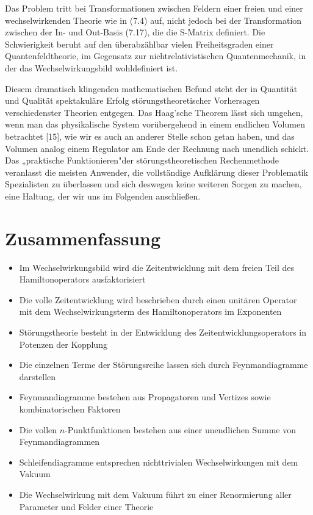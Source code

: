 \documentclass[10pt, letterpaper]{article}
\begin{document}
Das Problem tritt bei Transformationen zwischen Feldern einer freien und einer wechselwirkenden Theorie wie in (7.4) auf, nicht jedoch bei der Transformation zwischen der In- und Out-Basis (7.17), die die S-Matrix definiert. Die Schwierigkeit beruht auf den überabzählbar vielen Freiheitsgraden einer Quantenfeldtheorie, im Gegensatz zur nichtrelativistischen Quantenmechanik, in der das Wechselwirkungsbild wohldefiniert ist.

Diesem dramatisch klingenden mathematischen Befund steht der in Quantität und Qualität spektakuläre Erfolg störungstheoretischer Vorhersagen verschiedenster Theorien entgegen. Das Haag'sche Theorem lässt sich umgehen, wenn man das physikalische System vorübergehend in einem endlichen Volumen betrachtet [15], wie wir es auch an anderer Stelle schon getan haben, und das Volumen analog einem Regulator am Ende der Rechnung nach unendlich schickt. Das „praktische Funktionieren"der störungstheoretischen Rechenmethode veranlasst die meisten Anwender, die vollständige Aufklärung dieser Problematik Spezialisten zu überlassen und sich deswegen keine weiteren Sorgen zu machen, eine Haltung, der wir uns im Folgenden anschließen.

\section*{Zusammenfassung}
\begin{itemize}
  \item Im Wechselwirkungsbild wird die Zeitentwicklung mit dem freien Teil des Hamiltonoperators ausfaktorisiert
  \item Die volle Zeitentwicklung wird beschrieben durch einen unitären Operator mit dem Wechselwirkungsterm des Hamiltonoperators im Exponenten
  \item Störungstheorie besteht in der Entwicklung des Zeitentwicklungsoperators in Potenzen der Kopplung
  \item Die einzelnen Terme der Störungsreihe lassen sich durch Feynmandiagramme darstellen
  \item Feynmandiagramme bestehen aus Propagatoren und Vertizes sowie kombinatorischen Faktoren
  \item Die vollen $n$-Punktfunktionen bestehen aus einer unendlichen Summe von Feynmandiagrammen
  \item Schleifendiagramme entsprechen nichttrivialen Wechselwirkungen mit dem Vakuum
  \item Die Wechselwirkung mit dem Vakuum führt zu einer Renormierung aller Parameter und Felder einer Theorie
\end{itemize}
\end{document}

